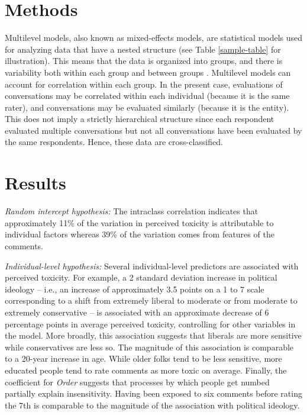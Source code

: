 \documentclass{article}
\begin{document}

\clearpage

\section{Methods}

Multilevel models, also known as mixed-effects models, are statistical models used for analyzing data that have a nested structure (see Table \ref{sample-table}  for illustration). This means that the data is organized into groups, and there is variability both within each group and between groups \citep{hox2017multilevel}. Multilevel models can account for correlation within each group. In the present case, evaluations of conversations may be correlated within each individual (because it is the same rater), and conversations may be evaluated similarly (because it is the entity). This does not imply a strictly hierarchical structure since each respondent evaluated multiple conversations but not all conversations have been evaluated by the same respondents. Hence, these data are cross-classified.

\section{Results}

\textit{Random intercept hypothesis:} The intraclass correlation indicates that approximately 11\% of the variation in perceived toxicity is attributable to individual factors whereas 39\% of the variation comes from features of the comments. 

\textit{Individual-level hypothesis:} Several individual-level predictors are associated with perceived toxicity. For example, a 2 standard deviation increase in political ideology -- i.e., an increase of approximately 3.5 points on a 1 to 7 scale corresponding to a shift from extremely liberal to moderate or from moderate to extremely conservative -- is associated with an approximate decrease of 6 percentage points in average perceived toxicity, controlling for other variables in the model. More broadly, this association suggests that liberals are more sensitive while conservatives are less so. The magnitude of this association is comparable to a 20-year increase in age. While older folks tend to be less sensitive, more educated people tend to rate comments as more toxic on average. Finally, the coefficient for \textit{Order} suggests that processes by which people get numbed partially explain insensitivity. Having been exposed to six comments before rating the 7th is comparable to the magnitude of the association with political ideology.
\end{document}
